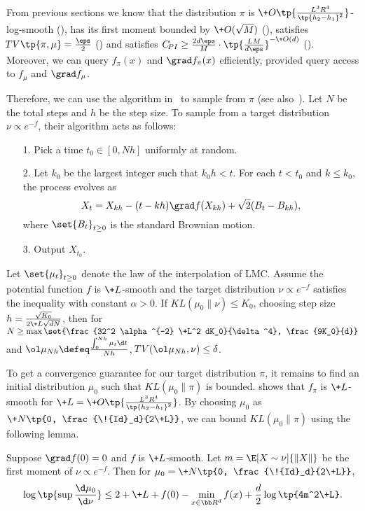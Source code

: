 From previous sections we know that the distribution $\pi$ is $\+O\tp{\frac{L^3R^4}{\tp{h_2-h_1}^2}}$-log-smooth (), has its first moment bounded by $\+O(\sqrt{M})$ (), satisfies $\DTV\tp{\pi,\mu}= \frac{\eps}{2}$ () and satisfies $C_{\!{PI}}\ge \frac{2d\eps}{M}\cdot \tp{\frac{LM}{d\eps}}^{-\+O(d)}$ (). Moreover, we can query $f_\pi(x)$ and $\grad f_\pi(x)$ efficiently, provided query access to $f_\mu$ and $\grad f_\mu$. 

Therefore, we can use the algorithm in~\cite{BCE+22} to sample from $\pi$ (see also~\cite[Chapter 11]{Che24}). Let $N$ be the total steps and $h$ be the step size. To sample from a target distribution $\nu\propto e^{-f}$, their algorithm acts as follows:
\begin{itemize}
    \item[1.] Pick a time $t_0\in[0,Nh]$ uniformly at random.
    \item[2.] Let $k_0$ be the largest integer such that $k_0 h<t$. For each $t<t_0$ and $k\leq k_0$, the process evolves as 
    \begin{equation}
        X_t = X_{kh} - (t-kh) \grad f(X_{kh}) + \sqrt{2}(B_t-B_{kh}), \label{eq:LMC2}
    \end{equation} 
    where $\set{B_t}_{t\geq 0}$ is the standard Brownian motion.
    \item[3.] Output $X_{t_0}$.
\end{itemize}

\begin{theorem}\label{thm:LMCforPI}
    Let $\set{\mu_t}_{t\geq 0}$ denote the law of the interpolation  of LMC. Assume the potential function $f$ is $\+L$-smooth and the target distribution $\nu\propto e^{-f}$ satisfies the \Poincare inequality with constant $\alpha>0$. If $\!{KL}(\mu_0 \| \nu)\leq K_0$, choosing step size $h=\frac{\sqrt{K_0}}{2\+L\sqrt{dN}}$, then for $N\geq \max\set{\frac{32^2 \alpha^{-2} \+L^2 dK_0}{\delta^4}, \frac{9K_0}{d}}$ and $\ol \mu_{Nh}\defeq \frac{\int_0^{Nh} \mu_t \d t}{Nh}$, $\DTV(\ol \mu_{Nh},\nu)\leq \delta$.
\end{theorem}

To get a convergence guarantee for our target distribution $\pi$, it remains to find an initial distribution $\mu_0$ such that $\!{KL}(\mu_0 \| \pi)$ is bounded.  shows that $f_{\pi}$ is $\+L$-smooth for $\+L=\+O\tp{\frac{L^3R^4}{\tp{h_2-h_1}^2}}$. By choosing $\mu_0$ as $\+N\tp{0, \frac{\!{Id}_d}{2\+L}}$, we can bound $\!{KL}(\mu_0 \| \pi)$ using the following lemma.
\begin{lemma}\label{lem:initial}
    Suppose $\grad f(0)= 0$ and $f$ is $\+L$-smooth. Let $m = \E[X\sim \nu]{\|X\|}$ be the first moment of $\nu \propto e^{-f}$. Then for $\mu_0=\+N\tp{0, \frac{\!{Id}_d}{2\+L}}$,
    \[
        \log \tp{\sup \frac{\d \mu_0}{\d \nu}} \leq 2+\+L + f(0)-\min_{x\in \bb R^d} f(x) + \frac{d}{2}\log \tp{4m^2\+L}.
    \]
\end{lemma}

